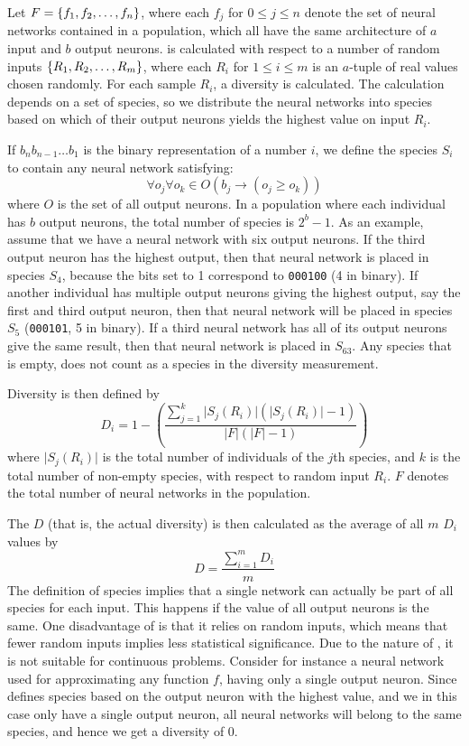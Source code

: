 Let $F = \left\{ f_1, f_2, \dots, f_n \right\}$, where each $f_j$ for $0 \leq j \leq n$ denote the set of neural networks contained in a population, which all have the same architecture of $a$ input and $b$ output neurons. \dia{} is calculated with respect to a number of random inputs $\left\{ R_1, R_2, \dots, R_m \right\}$, where each $R_i$ for $1 \leq i \leq m$ is an $a$-tuple of real values chosen randomly. For each sample $R_i$, a diversity is calculated. The calculation depends on a set of species, so we distribute the neural networks into species based on which of their output neurons yields the highest value on input $R_i$. 

If $b_nb_{n-1}\dots b_1$ is the binary representation of a number $i$,
we define the species $S_i$ to contain any neural network satisfying:
%
\[
  \forall o_j\forall o_k \in O \left(b_j \rightarrow \left(o_j \geq o_k\right)\right)
\]
%
where $O$ is the set of all output neurons.
In a population where each individual has $b$ output neurons, the total number of species is $2^b - 1$.  As an example, assume that we have a neural network with six output neurons. If the third output neuron has the highest output, then that neural network is placed in species $S_4$, because the bits set to 1 correspond to \texttt{000100} (4 in binary). If another individual has multiple output neurons giving the highest output, say the first and third output neuron, then that neural network will be placed in species $S_5$ (\texttt{000101}, 5 in binary). If a third neural network has all of its output neurons give the same result, then that neural network is placed in $S_{63}$. Any species that is empty, does not count as a species in the diversity measurement.

Diversity is then defined by
%
\begin{equation*}\label{eq:sdi}
  D_i = 1 - \left(\frac{\sum_{j=1}^{k}\lvert S_j\left(R_i\right)\rvert\left(\lvert S_j\left(R_i\right)\rvert - 1\right)}{\lvert F\rvert \left(\lvert F\rvert - 1\right)}\right) 
\end{equation*}
%
where $\lvert S_j(R_i)\rvert$ is the total number of individuals of the $j$th species, and $k$ is the total number of non-empty species, with respect to random input $R_i$. %
$F$ denotes the total number of neural networks in the population. 

The \dia{} $D$ (that is, the actual diversity) is then calculated as the average of all $m$ $D_i$ values by
%
\[D =\frac{\sum_{i=1}^m{D_i}}{m}\]
%
The definition of species implies that a single network can actually be part of all species for each input. This happens if the value of all output neurons is the same. One disadvantage of \dia{} is that it relies on random inputs, which means that fewer random inputs implies less statistical significance. Due to the nature of \dia, it is not suitable for continuous problems. Consider for instance a neural network used for approximating any function $f$, having only a single output neuron. Since \dia{} defines species based on the output neuron with the highest value, and we in this case only have a single output neuron, all neural networks will belong to the same species, and hence we get a diversity of 0.  
